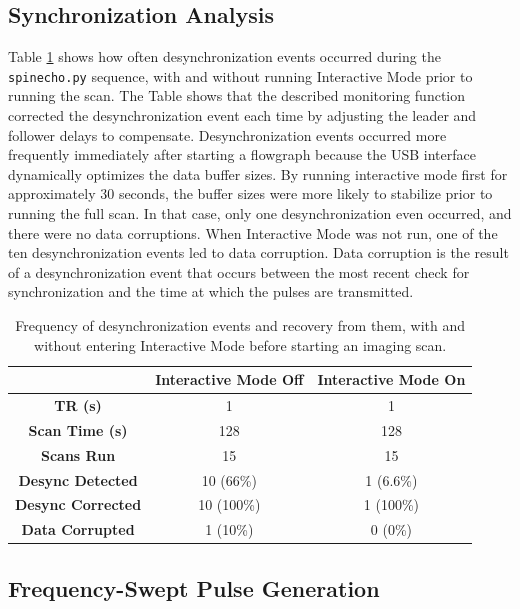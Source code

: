 \documentclass[review]{elsarticle}
\begin{document}
\subsection{Synchronization Analysis}
Table \ref{table:sync_table} shows how often desynchronization events occurred during the \texttt{spinecho.py} sequence,
with and without running Interactive Mode prior to running the scan.
The Table shows that the described monitoring function corrected the desynchronization event each time by adjusting the leader and follower delays to compensate.
Desynchronization events occurred more frequently immediately after starting a flowgraph 
because the USB interface dynamically optimizes the data buffer sizes.
By running interactive mode first for approximately 30 seconds, 
the buffer sizes were more likely to stabilize prior to running the full scan.
In that case, only one desynchronization even occurred, and there were no data corruptions.
When Interactive Mode was not run, 
one of the ten desynchronization events led to data corruption.
Data corruption is the result of a desynchronization event that occurs between the 
most recent check for synchronization and the time at which the pulses are transmitted.

\begin{table}
\begin{tabular}[c]{| c | c | c |}
	\hline
	 & \textbf{Interactive Mode Off} & \textbf{Interactive Mode On} \\ \hline
	\textbf{TR (s)} & 1 & 1 \\ \hline
	\textbf{Scan Time (s)} & 128 & 128 \\ \hline
	\textbf{Scans Run} & 15 & 15 \\ \hline
	\textbf{Desync Detected} & 10 (66\%) & 1 (6.6\%) \\ \hline
	\textbf{Desync Corrected} & 10 (100\%) & 1 (100\%) \\ \hline
	\textbf{Data Corrupted} & 1 (10\%) & 0 (0\%) \\ \hline
\end{tabular}
\caption{Frequency of desynchronization events and recovery from them, 
with and without entering Interactive Mode before starting an imaging scan.}
\label{table:sync_table}
\end{table}

\subsection{Frequency-Swept Pulse Generation}
\end{document}
